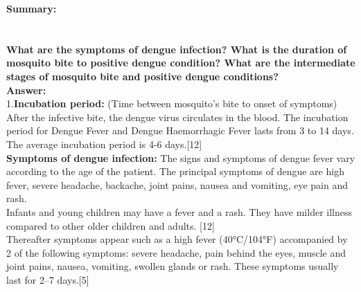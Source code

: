 \documentclass[11pt]{exam}
\begin{document}
\begin{questions}
\textbf{Summary:} \\
\\ \\

\question
\label{7. Nucleation }
\textbf{What are the symptoms of dengue infection? What is the duration of mosquito bite to positive dengue condition? What are the intermediate stages of mosquito bite and positive dengue conditions?}\\
\textbf{Answer:} \\
1.\textbf{Incubation period:} (Time between mosquito’s bite to onset of symptoms)
After the infective bite, the dengue virus circulates in the blood. The incubation period for Dengue Fever and Dengue Haemorrhagic Fever lasts
from 3 to 14 days. The average incubation period is 4-6 days.[12] \\
\textbf{Symptoms of dengue infection:} The signs and symptoms of dengue fever vary according to the age of the patient.
The principal symptoms of dengue are high fever, severe headache, backache,
joint pains, nausea and vomiting, eye pain and rash.\\
Infants and young children may have a fever and a rash. They have milder illness
compared to other older children and adults. [12]\\
Thereafter symptoms appear such as a high fever (40°C/104°F) accompanied by 2 of the following symptoms: severe headache, pain behind the eyes, muscle and joint pains, nausea, vomiting, swollen glands or rash. These symptoms usually last for 2–7 days.[5]\\


\end{questions}
\end{document}
